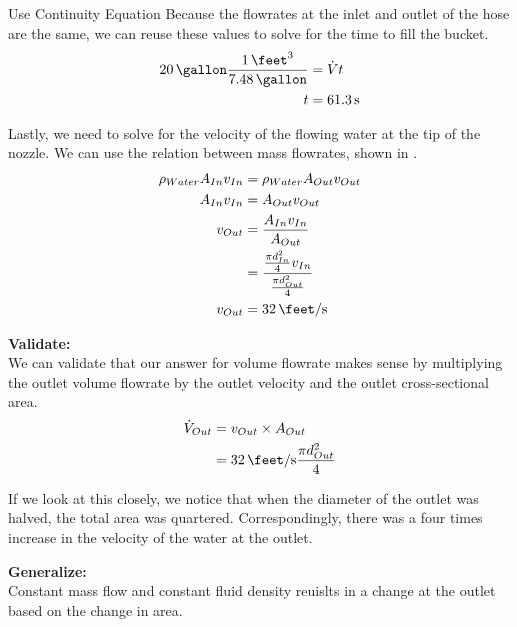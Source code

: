 \begin{example}{Use Continuity Equation}
  Because the flowrates at the inlet and outlet of the hose are the same, we can reuse these values to solve for the time to fill the bucket.
  \begin{align*}
    \SI{20}{\gallon} \frac{\SI{1}{\cubic\feet}}{\SI{7.48}{\gallon}} &= \FlowRate{\Volume} \Time \\
    \Time &= \SI{61.3}{\second}
  \end{align*}

  Lastly, we need to solve for the velocity of the flowing water at the tip of the nozzle.
  We can use the relation between mass flowrates, shown in .
  \begin{align*}
    \Density_{Water} \Area_{In} \Velocity_{In} &= \Density_{Water} \Area_{Out} \Velocity_{Out} \\
    \Area_{In} \Velocity_{In} &= \Area_{Out} \Velocity_{Out} \\
    \Velocity_{Out} &= \frac{\Area_{In} \Velocity_{In}}{\Area_{Out}} \\
                                               &= \frac{\frac{\pi \Diameter_{In}^{2}}{4} \Velocity_{In}}{\frac{\pi \Diameter_{Out}^{2}}{4}} \\
    \Velocity_{Out} &= \SI{32}{\feet\per\second}
  \end{align*}

  \textbf{Validate:} \\
  We can validate that our answer for volume flowrate makes sense by multiplying the outlet volume flowrate by the outlet velocity and the outlet cross-sectional area.
  \begin{align*}
    \FlowRate{\Volume}_{Out} &= \Velocity_{Out} \times \Area_{Out} \\
                             &= \SI{32}{\feet\per\second} \frac{\pi \Diameter_{Out}^{2}}{4} \\
  \end{align*}

  If we look at this closely, we notice that when the diameter of the outlet was halved, the total area was quartered.
  Correspondingly, there was a four times increase in the velocity of the water at the outlet.

  \textbf{Generalize:} \\
  Constant mass flow and constant fluid density reuislts in a change at the outlet based on the change in area.
\end{example}

